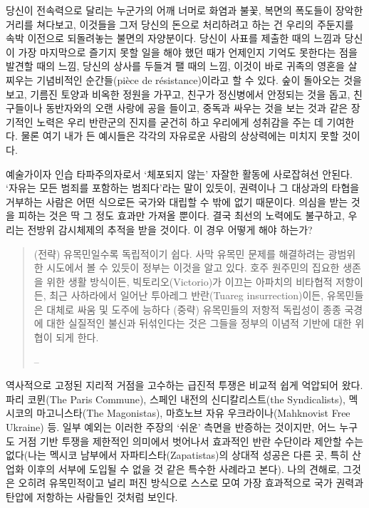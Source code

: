 \documentclass[10pt, b6paper, openany]{memoir}
\begin{document}
\begin{article}
당신이 전속력으로 달리는 누군가의 어깨 너머로 화염과 불꽃, 복면의 폭도들이 장악한 거리를 쳐다보고, 이것들을 그저 당신의 돈으로 처리하려고 하는 건 우리의 주둔지를 속박 이전으로 되돌려놓는 불면의 자양분이다. 당신이 사표를 제출한 때의 느낌과 당신이 가장 마지막으로 즐기지 못할 일을 해야 했던 때가 언제인지 기억도 못한다는 점을 발견할 때의 느낌, 당신의 상사를 두들겨 팰 때의 느낌, 이것이 바로 귀족의 영혼을 살찌우는 기념비적인 순간들(pièce de résistance)이라고 할 수 있다. 숲이 돌아오는 것을 보고, 기름진 토양과 비옥한 정원을 가꾸고, 친구가 정신병에서 안정되는 것을 돕고, 친구들이나 동반자와의 오랜 사랑에 공을 들이고, 중독과 싸우는 것을 보는 것과 같은 장기적인 노력은 우리 반란군의 진지를 굳건히 하고 우리에게 성취감을 주는 데 기여한다. 물론 여기 내가 든 예시들은 각각의 자유로운 사람의 상상력에는 미치지 못할 것이다.

예술가이자 인습 타파주의자로서  `체포되지 않는' 자잘한 활동에 사로잡혀선 안된다. `자유는 모든 범죄를 포함하는 범죄다'라는 말이 있듯이, 권력이나 그 대상과의 타협을 거부하는 사람은 어떤 식으로든 국가와 대립할 수 밖에 없기 때문이다. 의심을 받는 것을 피하는 것은 딱 그 정도 효과만 가져올 뿐이다. 결국 최선의 노력에도 불구하고, 우리는 전방위 감시체제의 추적을 받을 것이다. 이 경우 어떻게 해야 하는가? 

\begin{quote}
(전략) 유목민일수록 독립적이기 쉽다. 사막 유목민 문제를 해결하려는 광범위한 시도에서 볼 수 있듯이 정부는 이것을 알고 있다. 호주 원주민의 집요한 생존을 위한 생활 방식이든, 빅토리오(Victorio)가 이끄는 아파치의 비타협적 저항이든, 최근 사하라에서 일어난 투아레그 반란(Tuareg insurrection)이든, 유목민들은 대체로 싸움 및 도주에 능하다 (중략) 유목민들의 저항적 독립성이 종종 국경에 대한 실질적인 불신과 뒤섞인다는 것은 그들을 정부의 이념적 기반에 대한 위협이 되게 한다.

-- 
\end{quote}

역사적으로 고정된 지리적 거점을 고수하는 급진적 투쟁은 비교적 쉽게 억압되어 왔다. 파리 코뮌(The Paris Commune), 스페인 내전의 신디칼리스트(the Syndicalists), 멕시코의 마고니스타(The Magonistas), 마흐노브 자유 우크라이나(Mahknovist Free Ukraine) 등. 일부 예외는 이러한 주장의 `쉬운' 측면을 반증하는 것이지만, 어느 누구도 거점 기반 투쟁을 제한적인 의미에서 벗어나서 효과적인 반란 수단이라 제안할 수는 없다(나는 멕시코 남부에서 자파티스타(Zapatistas)의 상대적 성공은 다른 곳, 특히 산업화 이후의 서부에 도입될 수 없을 것 같은 특수한 사례라고 본다). 나의 견해로, 그것은 오히려 유목민적이고 널리 퍼진 방식으로 스스로 모여 가장 효과적으로 국가 권력과 탄압에 저항하는 사람들인 것처럼 보인다.


\end{article}
\end{document}
